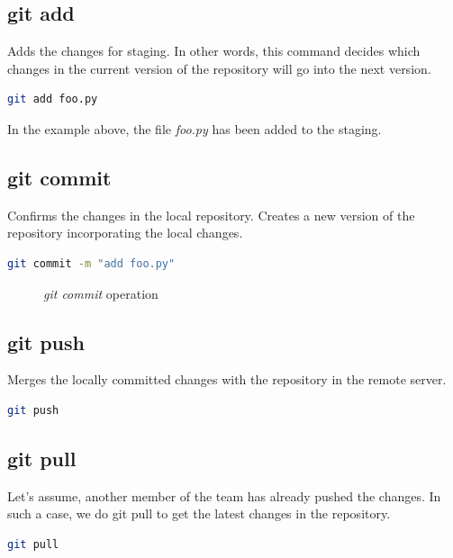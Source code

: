 \documentclass[letterpaper]{article}
\begin{document}
\subsection{git add}
Adds the changes for staging. In other words, this command decides which changes in the current version of the repository will go into the next version.
\begin{lstlisting}[language=Bash]
git add foo.py
\end{lstlisting}

In the example above, the file \textit{foo.py} has been added to the staging.

\subsection{git commit}
Confirms the changes in the local repository. Creates a new version of the repository incorporating the local changes.

\begin{lstlisting}[language=Bash]
git commit -m "add foo.py"
\end{lstlisting}

\begin{figure}[h]
    \centering
    \caption{\textit{git commit} operation}
  \end{figure}


\subsection{git push}
Merges the locally committed changes with the repository in the remote server.

\begin{lstlisting}[language=Bash]
git push
\end{lstlisting}


\subsection{git pull}
Let's assume, another member of the team has already pushed the changes. In such a case, we do git pull to get the latest changes in the repository. 

\begin{lstlisting}[language=Bash]
git pull
\end{lstlisting}
\end{document}
